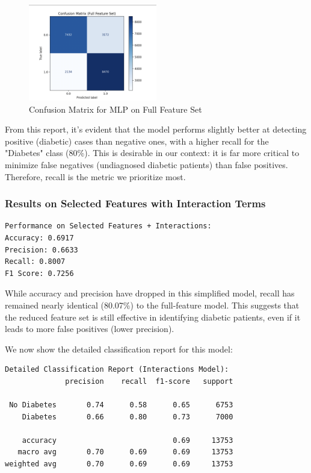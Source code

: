 \begin{figure}[H]
    \centering
    \includegraphics[width=0.5\textwidth]{images/confusion_matrix_full.png}
    \caption{Confusion Matrix for MLP on Full Feature Set}
\end{figure}

\noindent
From this report, it's evident that the model performs slightly better at detecting positive (diabetic) cases than negative ones, with a higher recall for the "Diabetes" class (80\%). This is desirable in our context: it is far more critical to minimize false negatives (undiagnosed diabetic patients) than false positives. Therefore, recall is the metric we prioritize most.

\subsubsection{Results on Selected Features with Interaction Terms}

\begin{verbatim}
Performance on Selected Features + Interactions:
Accuracy: 0.6917
Precision: 0.6633
Recall: 0.8007
F1 Score: 0.7256
\end{verbatim}

\noindent
While accuracy and precision have dropped in this simplified model, recall has remained nearly identical (80.07\%) to the full-feature model. This suggests that the reduced feature set is still effective in identifying diabetic patients, even if it leads to more false positives (lower precision).

\vspace{0.5em}
\noindent
We now show the detailed classification report for this model:

\begin{verbatim}
Detailed Classification Report (Interactions Model):
              precision    recall  f1-score   support

 No Diabetes       0.74      0.58      0.65      6753
    Diabetes       0.66      0.80      0.73      7000

    accuracy                           0.69     13753
   macro avg       0.70      0.69      0.69     13753
weighted avg       0.70      0.69      0.69     13753
\end{verbatim}

